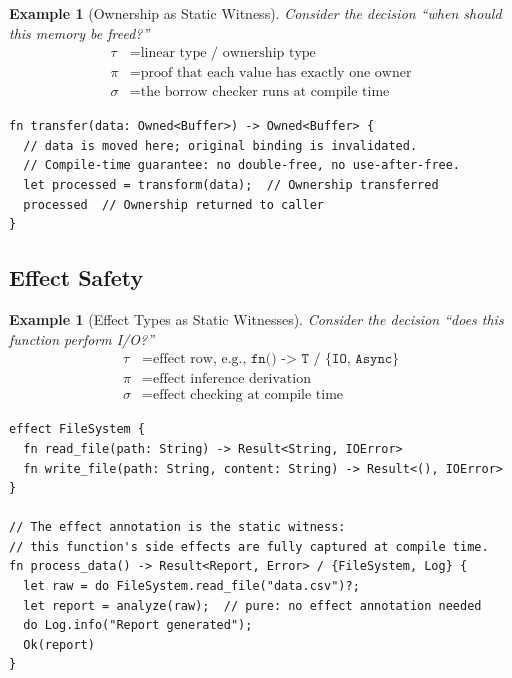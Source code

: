 \documentclass[11pt]{article}
\newtheorem{example}[theorem]{Example}
\begin{document}
\begin{example}[Ownership as Static Witness]
\label{ex:memory-safety}
Consider the decision ``when should this memory be freed?''
\begin{align*}
  \tau &= \text{linear type / ownership type} \\
  \pi &= \text{proof that each value has exactly one owner} \\
  \sigma &= \text{the borrow checker runs at compile time}
\end{align*}
\end{example}

\begin{lstlisting}[caption={Memory safety through ownership in JAPL}]
fn transfer(data: Owned<Buffer>) -> Owned<Buffer> {
  // data is moved here; original binding is invalidated.
  // Compile-time guarantee: no double-free, no use-after-free.
  let processed = transform(data);  // Ownership transferred
  processed  // Ownership returned to caller
}
\end{lstlisting}

\subsection{Effect Safety}

\begin{example}[Effect Types as Static Witnesses]
\label{ex:effect-safety}
Consider the decision ``does this function perform I/O?''
\begin{align*}
  \tau &= \text{effect row, e.g., } \texttt{fn() -> T / \{IO, Async\}} \\
  \pi &= \text{effect inference derivation} \\
  \sigma &= \text{effect checking at compile time}
\end{align*}
\end{example}

\begin{lstlisting}[caption={Effect safety through effect types in JAPL}]
effect FileSystem {
  fn read_file(path: String) -> Result<String, IOError>
  fn write_file(path: String, content: String) -> Result<(), IOError>
}

// The effect annotation is the static witness:
// this function's side effects are fully captured at compile time.
fn process_data() -> Result<Report, Error> / {FileSystem, Log} {
  let raw = do FileSystem.read_file("data.csv")?;
  let report = analyze(raw);  // pure: no effect annotation needed
  do Log.info("Report generated");
  Ok(report)
}
\end{lstlisting}
\end{document}

